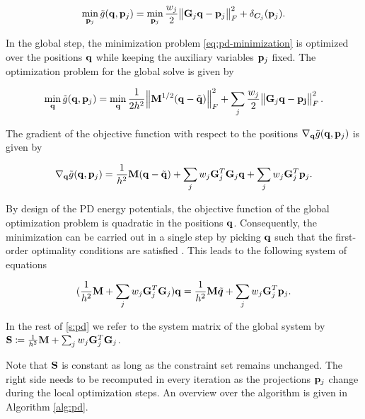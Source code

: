 \begin{equation}\label{eq:pd-local-minimization}
    \min_{\mathbf{p}_j} \tilde{g}(\mathbf{q}, \mathbf{p}_j) =
    \min_{\mathbf{p}_j} \frac{w_j}{2}\norm{\mathbf{G}_j\mathbf{q} - \mathbf{p}_j}^2_F + \delta_{\bm{C}_j}(\mathbf{p}_j).
\end{equation}

\noindent In the global step, the minimization problem \autoref{eq:pd-minimization} is optimized over the positions $\mathbf{q}$ 
while keeping the auxiliary variables $\mathbf{p}_j$ fixed. The optimization problem for the global solve is 
given by

\begin{equation}\label{eq:pd-global-minimization}
    \min_{\mathbf{q}} \tilde{g}(\mathbf{q}, \mathbf{p}_j) =
    \min_{\mathbf{q}} \frac{1}{2h^2} \norm{\mathbf{M}^{1/2}(\mathbf{q} - \tilde{\mathbf{q}})}^2_F + \sum_j \frac{w_j}{2} \norm{\mathbf{G}_j\mathbf{q} - \mathbf{p_j}}^2_F.
\end{equation}

\noindent The gradient of the objective function with respect to the positions $\nabla_{\mathbf{q}} 
\tilde{g}(\mathbf{q}, \mathbf{p}_j)$ is given by 

\begin{equation}\label{eq:pd-gradient-q}
    \nabla_{\mathbf{q}}\tilde{g}(\mathbf{q}, \mathbf{p}_j) = \frac{1}{h^2}\mathbf{M}(\mathbf{q} - \tilde{\mathbf{q}}) + \sum_j w_j \mathbf{G}^T_j \mathbf{G}_j \mathbf{q}
    + \sum_j w_j \mathbf{G}^T_j \mathbf{p}_j.
\end{equation}

\noindent By design of the PD energy potentials, the objective function of the global optimization problem is quadratic in the positions 
$\mathbf{q}$. Consequently, the minimization can be carried out in a single step by picking $\mathbf{q}$ such that the first-order optimality 
conditions are satisfied \cite{nocedal2006}. This leads to the following system of equations

\begin{equation}\label{eq:pd-global-system}
    (\frac{1}{h^2}\mathbf{M} + \sum_j w_j \mathbf{G}_j^T \mathbf{G}_j)\mathbf{q} = \frac{1}{h^2}\mathbf{M}\tilde{\bm{q}} + \sum_j w_j \mathbf{G}_j^T \mathbf{p}_j.
\end{equation}

\noindent In the rest of \cref{s:pd} we refer to the system matrix of the global system by 
$\mathbf{S} \coloneqq \frac{1}{h^2}\mathbf{M} + \sum_j w_j \mathbf{G}_j^T \mathbf{G}_j$.

Note that $\mathbf{S}$ is constant as long as the constraint set remains unchanged. The right side needs to be recomputed in every 
iteration as the projections $\mathbf{p}_j$ change during the local optimization steps.  An overview over the algorithm is given in 
Algorithm \ref{alg:pd}.

